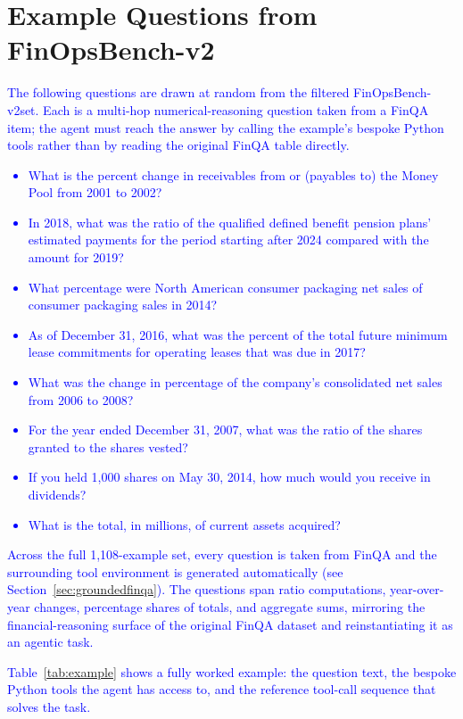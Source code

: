 \documentclass[11pt]{article}
\newcommand{\edit}[1]{\textcolor{blue}{#1}}
\newcommand{\groundedfinqa}{FinOpsBench-v2}\xspace
\begin{document}
\section{Example Questions from \groundedfinqa}
\label{app:example_queries_v2}

\edit{The following questions are drawn at random from the filtered \groundedfinqa set. Each is a multi-hop numerical-reasoning question taken from a FinQA item; the agent must reach the answer by calling the example's bespoke Python tools rather than by reading the original FinQA table directly.}

\edit{\begin{itemize}
    \item What is the percent change in receivables from or (payables to) the Money Pool from 2001 to 2002?
    \item In 2018, what was the ratio of the qualified defined benefit pension plans' estimated payments for the period starting after 2024 compared with the amount for 2019?
    \item What percentage were North American consumer packaging net sales of consumer packaging sales in 2014?
    \item As of December 31, 2016, what was the percent of the total future minimum lease commitments for operating leases that was due in 2017?
    \item What was the change in percentage of the company's consolidated net sales from 2006 to 2008?
    \item For the year ended December 31, 2007, what was the ratio of the shares granted to the shares vested?
    \item If you held 1{,}000 shares on May 30, 2014, how much would you receive in dividends?
    \item What is the total, in millions, of current assets acquired?
\end{itemize}}

\edit{Across the full 1{,}108-example set, every question is taken from FinQA and the surrounding tool environment is generated automatically (see Section~\ref{sec:groundedfinqa}). The questions span ratio computations, year-over-year changes, percentage shares of totals, and aggregate sums, mirroring the financial-reasoning surface of the original FinQA dataset and reinstantiating it as an agentic task.}

\edit{Table~\ref{tab:example} shows a fully worked example: the question text, the bespoke Python tools the agent has access to, and the reference tool-call sequence that solves the task.}
\end{document}

